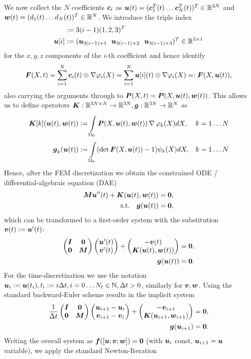 We now collect the $N$ coefficients $\vc_i$ as $\vu(t) = (\vc_1^T(t) \ldots \vc_N^T(t))^T \in\R^{3N}$
and $\vw(t) = (d_1(t) \ldots d_N(t))^T \in\R^N$.
We introduce the triple index
\begin{align}
	[i] &:= 3(i-1)(1, 2, 3)^T\\
	\vu[i] &:= (\vu_{3(i-1)+1}~~\vu_{3(i-1)+2}~~\vu_{3(i-1)+3})^T\in\R^{3\times 1}
\end{align}
for the $x,y,z$ components of the $i$-th coefficient and hence identify
\[
	\vF(X,t) = \sumi \vc_i(t)\otimes \nabla\varphi_i(X) = \sumi \vu[i](t)\otimes \nabla\varphi_i(X) =: \vF(X,\vu(t)),
\]
also carrying the arguments through to $\vP(X,t) = \vP(X,\vu(t),\vw(t))$.
This allows us to define operators $\vK: \R^{3N\times N}\to\R^{3N}, \vg:\R^{3N}\to\R^N$ as
\begin{align}
	\vK[k](\vu(t),\vw(t)) &:= \intor\vP(X,\vu(t),\vw(t))\divergence\varphi_k(X) dX, && k=1\ldots N\\
	\vg_k(\vu(t)) &:= \intor (\det\vF(X,\vu(t))-1)\psi_k(X)dX, && k=1\ldots N
\end{align}
Hence, after the FEM discretization we obtain the constrained ODE / differential-algebraic equation (DAE)
\begin{align}
	\vM\vu''(t) + \vK(\vu(t),\vw(t)) &= \vnull,\\
		\text{s.t.}\quad \vg(\vu(t))		&= \vnull,
\end{align}
which can be transformed to a first-order system with the substitution $\vv(t) := \vu'(t)$:
\begin{align}
	\m{\vI & \vnull\\ \vnull & \vM}\m{\vu'(t)\\ \vv'(t)} + \m{-\vv(t) \\ \vK(\vu(t),\vw(t))} &= \vnull,\\
	\vg(\vu(t))		&= \vnull.
\end{align}
For the time-discretization we use the notation $\vu_i := \vu(t_i), t_i := i\Delta t, i=0\ldots N_t\in\N, \Delta t > 0$, similarly for $\vv,\vw$.
Using the standard backward-Euler scheme results in the implicit system
\begin{align}
	\frac{1}{\Delta t}\m{\vI & \vnull\\ \vnull & \vM}\m{\vu_{i+1}-\vu_i\\\vv_{i+1}-\vv_i} + \m{- \vv_{i+1}\\\vK(\vu_{i+1},\vw_{i+1})} &= \vnull,\\
	\vg(\vu_{i+1})		&= \vnull.
\end{align}
Writing the overall system as $\vf([\vu; \vv; \vw]) = \vnull$ (with $\vu_i$ const, $\vu_{i+1}=\vu$ variable), we apply the standard Newton-Iteration

